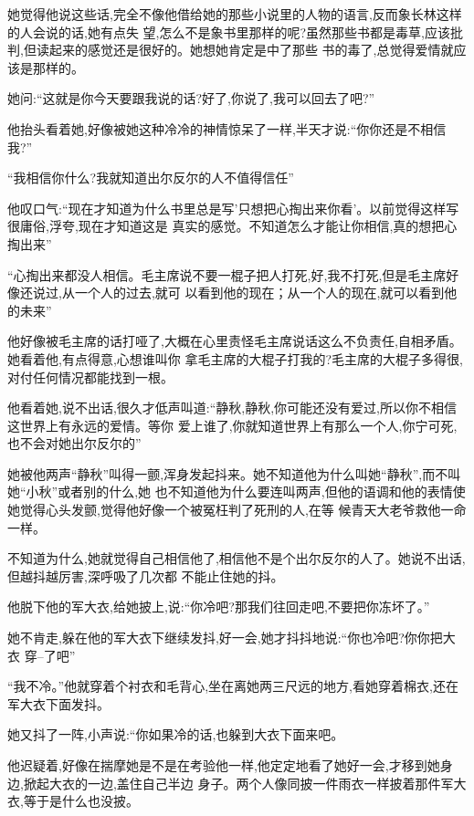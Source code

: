 ﻿\documentclass[12pt]{article}
\begin{document}
她觉得他说这些话,完全不像他借给她的那些小说里的人物的语言,反而象\myrule 长林这样的人会说的话,她有点失
望,怎么不是象书里那样的呢?虽然那些书都是毒草,应该批判,但读起来的感觉还是很好的。她想她肯定是中了那些
书的毒了,总觉得爱情就应该是那样的。

她问:``这就是你今天要跟我说的话?好了,你说了,我可以回去了吧?''

他抬头看着她,好像被她这种冷冷的神情惊呆了一样,半天才说:``你\myrule 你还是不相信我?''

``我相信你什么?我就知道出尔反尔的人不值得信任\myrule ''

他叹口气:``现在才知道为什么书里总是写'只想把心掏出来你看'。以前觉得这样写很庸俗,浮夸,现在才知道这是
\myrule 真实的感觉。不知道怎么才能让你相信,真的想把心掏出来\myrule ''

``心掏出来都没人相信。毛主席说不要一棍子把人打死,好,我不打死,但是毛主席好像还说过,从一个人的过去,就可
以看到他的现在；从一个人的现在,就可以看到他的未来\myrule ''

他好像被毛主席的话打哑了,大概在心里责怪毛主席说话这么不负责任,自相矛盾。她看着他,有点得意,心想谁叫你
拿毛主席的大棍子打我的?毛主席的大棍子多得很,对付任何情况都能找到一根。

他看着她,说不出话,很久才低声叫道:``静秋,静秋,你可能还没有爱过,所以你不相信这世界上有永远的爱情。等你
爱上谁了,你就知道世界上有那么一个人,你宁可死,也不会对她出尔反尔的\myrule ''

她被他两声``静秋''叫得一颤,浑身发起抖来。她不知道他为什么叫她``静秋'',而不叫她``小秋''或者别的什么,她
也不知道他为什么要连叫两声,但他的语调和他的表情使她觉得心头发颤,觉得他好像一个被冤枉判了死刑的人,在等
候青天大老爷救他一命一样。

不知道为什么,她就觉得自己相信他了,相信他不是个出尔反尔的人了。她说不出话,但越抖越厉害,深呼吸了几次都
不能止住她的抖。

他脱下他的军大衣,给她披上,说:``你冷吧?那我们往回走吧,不要把你冻坏了。''


她不肯走,躲在他的军大衣下继续发抖,好一会,她才抖抖地说:``你\myrule 也冷吧?你\myrule 你把大\myrule 衣
穿--了吧\myrule ''

``我不冷。''他就穿着个衬衣和毛背心,坐在离她两三尺远的地方,看她穿着棉衣,还在军大衣下面发抖。

她又抖了一阵,小声说:``你\myrule 如果冷\myrule 的\myrule 话,也\myrule 躲到\myrule 大衣下面\myrule 来吧。

他迟疑着,好像在揣摩她是不是在考验他一样,他定定地看了她好一会,才移到她身边,掀起大衣的一边,盖住自己半边
身子。两个人像同披一件雨衣一样披着那件军大衣,等于是什么也没披。
\end{document}
